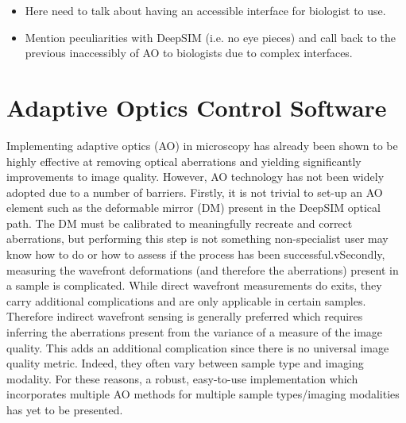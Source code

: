 \begin{itemize}
	\item Here need to talk about having an accessible interface for biologist to use.
	\item Mention peculiarities with DeepSIM (i.e. no eye pieces) and call back to the previous inaccessibly of AO to biologists due to complex interfaces.
\end{itemize}

\section{Adaptive Optics Control Software}
\label{sec:AOtools}

Implementing adaptive optics (AO) in microscopy has already been shown to be highly effective at removing optical aberrations and yielding significantly improvements to image quality.\cite{booth2014adaptive,girkin2009adaptive} However, AO technology has not been widely adopted due to a number of barriers. Firstly, it is not trivial to set-up an AO element such as the deformable mirror (DM) present in the DeepSIM optical path. The DM must be calibrated to meaningfully recreate and correct aberrations, but performing this step is not something non-specialist user may know how to do or how to assess if the process has been successful.vSecondly, measuring the wavefront deformations (and therefore the aberrations) present in a sample is complicated. While direct wavefront measurements do exits, they carry additional complications and are only applicable in certain samples.\cite{wang2014rapid,wang2015direct} Therefore indirect wavefront sensing is generally preferred which requires inferring the aberrations present from the variance of a measure of the image quality.\cite{rodriguez2018adaptive} This adds an additional complication since there is no universal image quality metric. Indeed, they often vary between sample type and imaging modality.\cite{burke2015adaptive,booth2002adaptive,fienup2003aberration,debarre2008adaptive} For these reasons, a robust, easy-to-use implementation which incorporates multiple AO methods for multiple sample types/imaging modalities has yet to be presented.\cite{ji2017adaptive}

